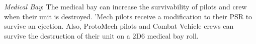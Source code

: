 \emph{Medical Bay}: The medical bay can increase the survivability of pilots and crew when their unit is destroyed.
'Mech pilots receive a modification to their PSR to survive an ejection.
Also, ProtoMech pilots and Combat Vehicle crews can survive the destruction of their unit on a 2D6 medical bay roll.
